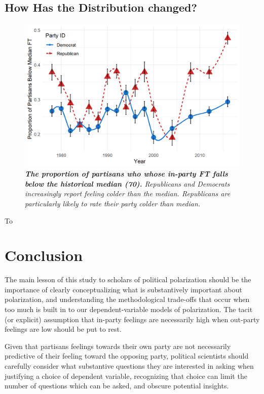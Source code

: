 \documentclass[12pt]{article}
\begin{document}
\subsection{How Has the Distribution changed?}

\begin{figure}[H]
\center\includegraphics[width=5in]{cdf-below-med.png}
\caption{\label{fig:cdf-below-med} \textit{\textbf{The proportion of partisans who whose in-party FT falls below the historical median (70).} Republicans and Democrats increasingly report feeling colder than the median. Republicans are particularly likely to rate their party colder than median.}}
\end{figure}

To 






\section{Conclusion}
The main lesson of this study to scholars of political polarization should be the importance of clearly conceptualizing what is substantively important about polarization, and understanding the methodological trade-offs that occur when too much is built in to our dependent-variable models of polarization. The tacit (or explicit) assumption that in-party feelings are necessarily high when out-party feelings are low should be put to rest.

Given that partisans feelings towards their own party are not necessarily predictive of their feeling toward the opposing party, political scientists should carefully consider what substantive questions they are interested in asking when justifying a choice of dependent variable, recognizing that choice can limit the number of questions which can be asked, and obscure potential insights.
\end{document}
